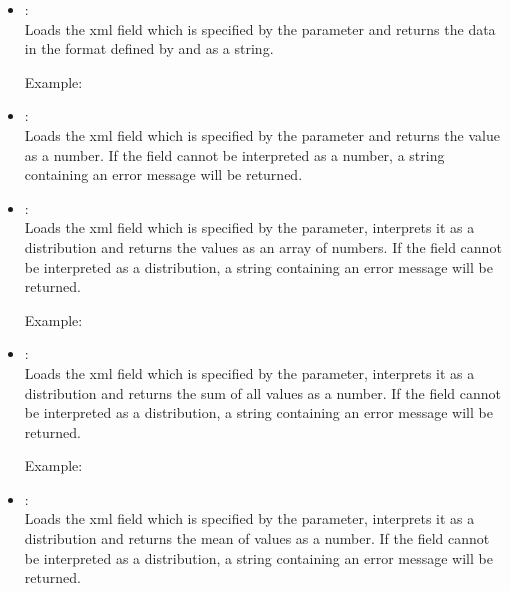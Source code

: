 \begin{itemize}
	
\item
{}:\\
Loads the xml field which is specified by the parameter and returns the data in the format
defined by  and  as a string.

Example:\\
  
\item
{}:\\
Loads the xml field which is specified by the parameter and returns the value as a number.
If the field cannot be interpreted as a number, a string containing an error message will be returned.  
	
\item
{}:\\
Loads the xml field which is specified by the parameter, interprets it as a distribution and
returns the values as an array of numbers.
If the field cannot be interpreted as a distribution, a string containing an error message will be returned.

Example:\\

\item
{}:\\
Loads the xml field which is specified by the parameter, interprets it as a distribution and
returns the sum of all values as a number.
If the field cannot be interpreted as a distribution, a string containing an error message will be returned.	

Example:\\

\item
{}:\\
Loads the xml field which is specified by the parameter, interprets it as a distribution and
returns the mean of values as a number.
If the field cannot be interpreted as a distribution, a string containing an error message will be returned.
	

\end{itemize}
